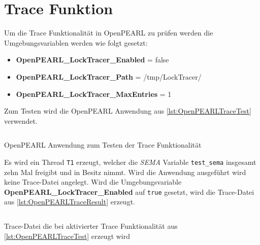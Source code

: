 \section{Trace Funktion}\label{Validierung:Trace Funktion}
\label{section:ValidierungTraceFunktion}
Um die Trace Funktionalität in OpenPEARL zu prüfen werden die Umgebungsvariablen
werden wie folgt gesetzt:
\begin{itemize}
  \item \textbf{OpenPEARL\-\_LockTracer\-\_Enabled} = false
  \item \textbf{OpenPEARL\-\_LockTracer\-\_Path} = /tmp/LockTracer/
  \item \textbf{OpenPEARL\-\_LockTracer\-\_MaxEntries} = 1
\end{itemize}
Zum Testen wird die OpenPEARL Anwendung aus \cref{lst:OpenPEARLTraceTest}
verwendet. 
\begin{listing}[ht]
  \inputminted[frame=lines,linenos]{vim}{./OpenPEARL/TraceTest.prl}
  \caption{OpenPEARL Anwendung zum Testen der Trace Funktionalität}
  \label{lst:OpenPEARLTraceTest}   
\end{listing}
Es wird ein Thread \texttt{T1} erzeugt, welcher die \textit{SEMA} Variable
\texttt{test\_sema} insgesamt zehn Mal freigibt und in Besitz nimmt. Wird die
Anwendung ausgeführt wird keine Trace-Datei angelegt. Wird die Umgebungsvariable
\textbf{OpenPEARL\-\_LockTracer\-\_Enabled} auf \texttt{true} gesetzt, wird die
Trace-Datei aus \cref{lst:OpenPEARLTraceResult} erzeugt.
\begin{listing}[ht]
  \begin{minipage}[ht]{\linewidth}
    \begin{multicols}{2}
      \inputminted[linenos]{text}{./OpenPEARL/TraceTestResult.log}
    \end{multicols}
    \caption{Trace-Datei die bei aktivierter Trace Funktionalität aus \cref{lst:OpenPEARLTraceTest} erzeugt wird}
  \label{lst:OpenPEARLTraceResult}   
  \end{minipage}
\end{listing}

